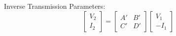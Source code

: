 \begin{multicols}{2}
\begin{CheatsheetEntryFrame}
        Inverse Transmission Parameters:
        \begin{equation*}
            \begin{bmatrix}
                V_2 \\
                I_2
            \end{bmatrix}
            =
            \begin{bmatrix}
                A' & B' \\
                C' & D'
            \end{bmatrix}
            \begin{bmatrix}
                V_1 \\
                -I_1
            \end{bmatrix}
        \end{equation*}

    \end{CheatsheetEntryFrame}

    \MulticolsBreak

    \begin{CheatsheetEntryFrame}

        \newcommand{\MyReusableFormatting}{
            \path (0,0) -- (0,1.6); %
            \path
                (0,0)      coordinate (N)
                (150:1.70) coordinate (A)
                ( 30:1.70) coordinate (B)
                (-90:1.70) coordinate (C)
            ;
            \draw
                (A) ++(150:0.3) node {$a$}
                (B) ++( 30:0.3) node {$b$}
                (C) ++(-90:0.3) node {$c$}
            ;
        }



\end{CheatsheetEntryFrame}
\end{multicols}
